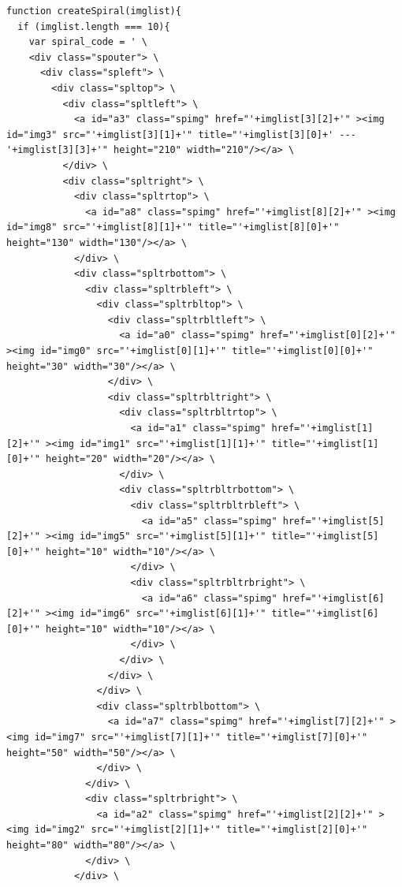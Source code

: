 \begin{listing}
  \begin{verbatim}
function createSpiral(imglist){
  if (imglist.length === 10){
    var spiral_code = ' \
    <div class="spouter"> \
      <div class="spleft"> \
        <div class="spltop"> \
          <div class="spltleft"> \
            <a id="a3" class="spimg" href="'+imglist[3][2]+'" ><img id="img3" src="'+imglist[3][1]+'" title="'+imglist[3][0]+' --- '+imglist[3][3]+'" height="210" width="210"/></a> \
          </div> \
          <div class="spltright"> \
            <div class="spltrtop"> \
              <a id="a8" class="spimg" href="'+imglist[8][2]+'" ><img id="img8" src="'+imglist[8][1]+'" title="'+imglist[8][0]+'" height="130" width="130"/></a> \
            </div> \
            <div class="spltrbottom"> \
              <div class="spltrbleft"> \
                <div class="spltrbltop"> \
                  <div class="spltrbltleft"> \
                    <a id="a0" class="spimg" href="'+imglist[0][2]+'" ><img id="img0" src="'+imglist[0][1]+'" title="'+imglist[0][0]+'" height="30" width="30"/></a> \
                  </div> \
                  <div class="spltrbltright"> \
                    <div class="spltrbltrtop"> \
                      <a id="a1" class="spimg" href="'+imglist[1][2]+'" ><img id="img1" src="'+imglist[1][1]+'" title="'+imglist[1][0]+'" height="20" width="20"/></a> \
                    </div> \
                    <div class="spltrbltrbottom"> \
                      <div class="spltrbltrbleft"> \
                        <a id="a5" class="spimg" href="'+imglist[5][2]+'" ><img id="img5" src="'+imglist[5][1]+'" title="'+imglist[5][0]+'" height="10" width="10"/></a> \
                      </div> \
                      <div class="spltrbltrbright"> \
                        <a id="a6" class="spimg" href="'+imglist[6][2]+'" ><img id="img6" src="'+imglist[6][1]+'" title="'+imglist[6][0]+'" height="10" width="10"/></a> \
                      </div> \
                    </div> \
                  </div> \
                </div> \
                <div class="spltrblbottom"> \
                  <a id="a7" class="spimg" href="'+imglist[7][2]+'" ><img id="img7" src="'+imglist[7][1]+'" title="'+imglist[7][0]+'" height="50" width="50"/></a> \
                </div> \
              </div> \
              <div class="spltrbright"> \
                <a id="a2" class="spimg" href="'+imglist[2][2]+'" ><img id="img2" src="'+imglist[2][1]+'" title="'+imglist[2][0]+'" height="80" width="80"/></a> \
              </div> \
            </div> \

\end{verbatim}
\end{listing}
